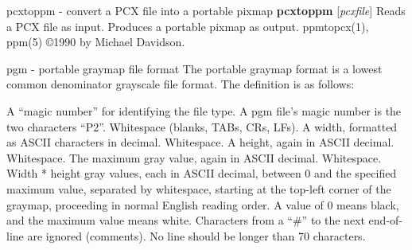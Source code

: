 pcxtoppm - convert a PCX file into a portable pixmap
{\bf pcxtoppm}
{\rm [}{\it pcxfile}{\rm ]}
Reads a PCX file as input.
Produces a portable pixmap as output.
ppmtopcx(1), ppm(5)
\copyright 1990 by Michael Davidson.
%
 
%

\newpage
%

pgm - portable graymap file format
The portable graymap format is a lowest common denominator grayscale
file format.
The definition is as follows:
\begin{IPlist}
\IPitem{{-}}
A ``magic number'' for identifying the file type.
A pgm file's magic number is the two characters ``P2''.
\IPitem{{-}}
Whitespace (blanks, TABs, CRs, LFs).
\IPitem{{-}}
A width, formatted as ASCII characters in decimal.
\IPitem{{-}}
Whitespace.
\IPitem{{-}}
A height, again in ASCII decimal.
\IPitem{{-}}
Whitespace.
\IPitem{{-}}
The maximum gray value, again in ASCII decimal.
\IPitem{{-}}
Whitespace.
\IPitem{{-}}
Width * height gray values, each in ASCII decimal, between 0 and the specified
maximum value, separated by whitespace, starting at the top-left
corner of the graymap, proceeding in normal English reading order.
A value of 0 means black, and the maximum value means white.
\IPitem{{-}}
Characters from a ``\#'' to the next end-of-line are ignored (comments).
\IPitem{{-}}
No line should be longer than 70 characters.
\end{IPlist}

